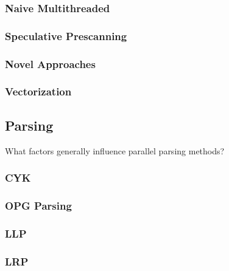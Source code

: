 \subsubsection{Naive Multithreaded}
\cite{barenghi_parallel_2015, mytkowicz_data-parallel_2014}

\subsubsection{Speculative Prescanning}
\cite{li_plex_2021}

\subsubsection{Novel Approaches}
\cite{sinya_simultaneous_2013, lin_accelerating_2013}

\subsubsection{Vectorization}
\cite{wang_hyperscan_2019}

\subsection{Parsing}
\begin{sectionplan}
    What factors generally influence parallel parsing methods?
\end{sectionplan}
\cite{mark_thierry_vandevoorde_parallel_1988}

\subsubsection{CYK}
\cite{skrzypczak_parallel_nodate}
\subsubsection{OPG Parsing}
\cite{barenghi_parallel_2015, li_associative_2023}
\subsubsection{LLP}
\cite{robin_voetter_parallel_2021}
\subsubsection{LRP}


